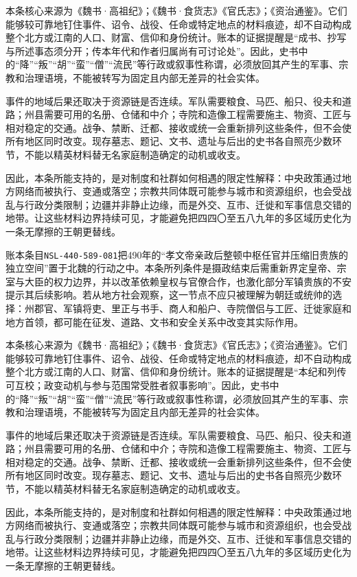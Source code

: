 本条核心来源为《魏书·高祖纪》；《魏书·食货志》《官氏志》；《资治通鉴》。它们能够较可靠地钉住事件、诏令、战役、任命或特定地点的材料痕迹，却不自动构成整个北方或江南的人口、财富、信仰和身份统计。账本的证据提醒是“成书、抄写与所述事态须分开；传本年代和作者归属尚有可讨论处”。因此，史书中的“降”“叛”“胡”“蛮”“僧”“流民”等行政或叙事性称谓，必须放回其产生的军事、宗教和治理语境，不能被转写为固定且内部无差异的社会实体。

事件的地域后果还取决于资源链是否连续。军队需要粮食、马匹、船只、役夫和道路；州县需要可用的名册、仓储和中介；寺院和造像工程需要施主、物资、工匠与相对稳定的交通。战争、禁断、迁都、接收或统一会重新排列这些条件，但不会使所有地区同时改变。现存墓志、题记、文书、遗址与后出的史书各自照亮少数环节，不能以精英材料替无名家庭制造确定的动机或收支。

因此，本条所能支持的，是对制度和社群如何相遇的限定性解释：中央政策通过地方网络而被执行、变通或落空；宗教共同体既可能参与城市和资源组织，也会受战乱与行政分类限制；边疆并非静止边缘，而是外交、互市、迁徙和军事信息交错的地带。让这些材料边界持续可见，才能避免把四四〇至五八九年的多区域历史化为一条无摩擦的王朝更替线。

账本条目\texttt{NSL-440-589-081}把490年的“孝文帝亲政后整顿中枢任官并压缩旧贵族的独立空间”置于北魏的行动之中。本条所列条件是摄政结束后需重新界定皇帝、宗室与大臣的权力边界，并以改革依赖皇权与官僚合作，也激化部分军镇贵族的不安提示其后续影响。若从地方社会观察，这一节点不应只被理解为朝廷或统帅的选择：州郡官、军镇将吏、里正与书手、商人和船户、寺院僧侣与工匠、迁徙家庭和地方首领，都可能在征发、道路、文书和安全关系中改变其实际作用。

本条核心来源为《魏书·高祖纪》；《魏书·食货志》《官氏志》；《资治通鉴》。它们能够较可靠地钉住事件、诏令、战役、任命或特定地点的材料痕迹，却不自动构成整个北方或江南的人口、财富、信仰和身份统计。账本的证据提醒是“本纪和列传可互校；政变动机与参与范围常受胜者叙事影响”。因此，史书中的“降”“叛”“胡”“蛮”“僧”“流民”等行政或叙事性称谓，必须放回其产生的军事、宗教和治理语境，不能被转写为固定且内部无差异的社会实体。

事件的地域后果还取决于资源链是否连续。军队需要粮食、马匹、船只、役夫和道路；州县需要可用的名册、仓储和中介；寺院和造像工程需要施主、物资、工匠与相对稳定的交通。战争、禁断、迁都、接收或统一会重新排列这些条件，但不会使所有地区同时改变。现存墓志、题记、文书、遗址与后出的史书各自照亮少数环节，不能以精英材料替无名家庭制造确定的动机或收支。

因此，本条所能支持的，是对制度和社群如何相遇的限定性解释：中央政策通过地方网络而被执行、变通或落空；宗教共同体既可能参与城市和资源组织，也会受战乱与行政分类限制；边疆并非静止边缘，而是外交、互市、迁徙和军事信息交错的地带。让这些材料边界持续可见，才能避免把四四〇至五八九年的多区域历史化为一条无摩擦的王朝更替线。

